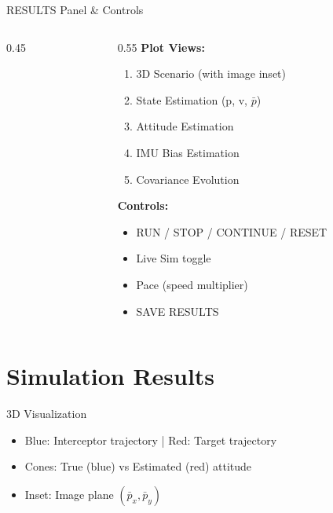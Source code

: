 \documentclass{beamer}
\begin{document}
\begin{frame}{RESULTS Panel \& Controls}
\begin{columns}
\begin{column}{0.45\textwidth}
\end{column}

\begin{column}{0.55\textwidth}
\textbf{Plot Views:}
\begin{enumerate}
    \item 3D Scenario (with image inset)
    \item State Estimation (p, v, $\bar{p}$)
    \item Attitude Estimation
    \item IMU Bias Estimation
    \item Covariance Evolution
\end{enumerate}

\vspace{0.3cm}
\textbf{Controls:}
\begin{itemize}
    \item RUN / STOP / CONTINUE / RESET
    \item Live Sim toggle
    \item Pace (speed multiplier)
    \item SAVE RESULTS
\end{itemize}
\end{column}
\end{columns}
\end{frame}

\section{Simulation Results}

\begin{frame}{3D Visualization}
\begin{center}
\end{center}

\begin{itemize}
    \item Blue: Interceptor trajectory | Red: Target trajectory
    \item Cones: True (blue) vs Estimated (red) attitude
    \item Inset: Image plane $(\bar{p}_x, \bar{p}_y)$
\end{itemize}
\end{frame}
\end{document}

